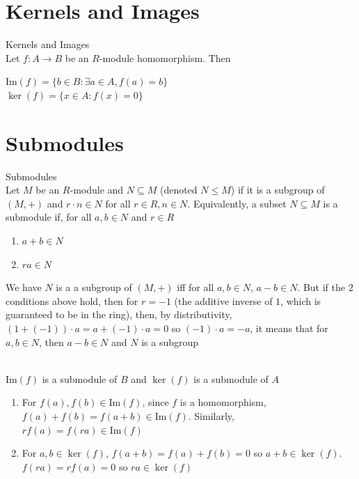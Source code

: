 \documentclass{report}
\begin{document}
\section{Kernels and Images}
\begin{definition}{Kernels and Images}{}\\
    Let $f: A\to B$ be an $R$-module homomorphism. Then
    \begin{center}
        $\text{Im} (f) = \{b \in B: \exists a\in A, f(a)=b\}$ \\
        $\ker (f)=\{x \in A:f(x)=0\}$
    \end{center}
\end{definition}

\section{Submodules}
\begin{definition}{Submodules}{} \\
  Let $M$ be an $R$-module and $N \subseteq M$ (denoted $N \le M$) if it is a subgroup of $(M, +)$ and $r\cdot n\in N$ for all $r\in R, n\in N$. Equivalently, a subset $N \subseteq M$ is a submodule if, for all $a,b \in N$ and $r \in R$
  \begin{enumerate}
      \item $a+b \in N$
      \item $ra \in N$
  \end{enumerate}
  We have $N$ is a a subgroup of $(M, +)$ iff for all $a,b \in N$, $a-b\in N$. But if the 2 conditions above hold, then for $r = -1$ (the additive inverse of $1$, which is guaranteed to be in the ring), then, by distributivity, $(1+(-1))\cdot a=a+(-1)\cdot a=0$ so $(-1)\cdot a=-a$, it means that for $a,b \in N$, then $a-b \in N$ and $N$ is a subgroup
\end{definition}

\begin{lemma}{}{}\\
    $\text{Im}(f)$ is a submodule of $B$ and $\ker (f)$ is a submodule of $A$ 
\end{lemma}
\begin{prf}{}{}
    \begin{enumerate}
        \item For $f(a), f(b) \in \text{Im}(f)$, since $f$ is a homomorphism, $f(a)+f(b)=f(a+b) \in \text{Im}(f)$. Similarly, $rf(a) = f(ra) \in \text{Im}(f)$
        \item For $a,b\in \ker (f)$, $f(a+b)=f(a)+f(b)=0$ so $a+b \in \ker (f)$. $f(ra)=rf(a)=0$ so $ra \in \ker (f)$
    \end{enumerate}
\end{prf}
\end{document}
